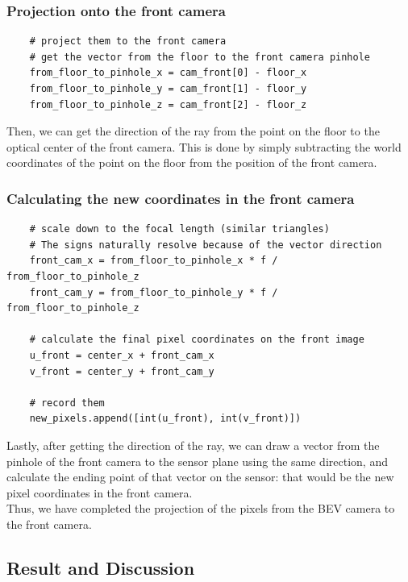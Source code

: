 \documentclass{article}
\begin{document}
\subsubsection{Projection onto the front camera}
\begin{verbatim}
    # project them to the front camera
    # get the vector from the floor to the front camera pinhole
    from_floor_to_pinhole_x = cam_front[0] - floor_x
    from_floor_to_pinhole_y = cam_front[1] - floor_y
    from_floor_to_pinhole_z = cam_front[2] - floor_z
\end{verbatim}
Then, we can get the direction of the ray from the point on the floor to the optical center 
of the front camera. This is done by simply subtracting the world coordinates of the point 
on the floor from the position of the front camera.

\subsubsection{Calculating the new coordinates in the front camera}
\begin{verbatim}
    # scale down to the focal length (similar triangles)
    # The signs naturally resolve because of the vector direction
    front_cam_x = from_floor_to_pinhole_x * f / from_floor_to_pinhole_z
    front_cam_y = from_floor_to_pinhole_y * f / from_floor_to_pinhole_z 
    
    # calculate the final pixel coordinates on the front image
    u_front = center_x + front_cam_x
    v_front = center_y + front_cam_y
    
    # record them
    new_pixels.append([int(u_front), int(v_front)])
\end{verbatim}
Lastly, after getting the direction of the ray, we can draw a vector from the pinhole of the 
front camera to the sensor plane using the same direction, and calculate the ending point of 
that vector on the sensor: that would be the new pixel coordinates in the front camera.
\\
Thus, we have completed the projection of the pixels from the BEV camera to the front camera.

\subsection{Result and Discussion}
\end{document}
